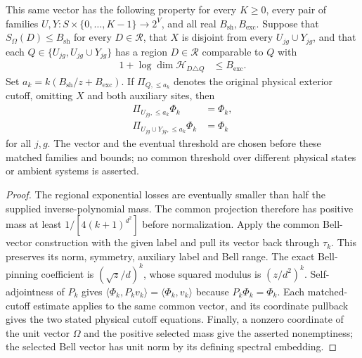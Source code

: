 \begin{theorem}
    This same vector has the following property for every $K\ge0$, every
    pair of families $U,Y:S\times\{0,\ldots,K-1\}\to2^V$, and all real
    $B_{\mathrm{sh}},B_{\mathrm{exc}}$. Suppose that
    $S_\Omega(D)\le B_{\mathrm{sh}}$ for every $D\in\mathcal R$, that
    $X$ is disjoint from every $U_{jg}\cup Y_{jg}$, and that each
    $Q\in\{U_{jg},U_{jg}\cup Y_{jg}\}$ has a region $D\in\mathcal R$
    comparable to $Q$ with
    \begin{align*}
        1+\log\dim\mathcal H_{D\triangle Q}&\le B_{\mathrm{exc}}.
    \end{align*}
    Set $a_k=k(B_{\mathrm{sh}}/z+B_{\mathrm{exc}})$. If
    $\Pi_{Q,\le a_k}$ denotes the original physical exterior cutoff,
    omitting $X$ and both auxiliary sites, then
    \begin{align*}
        \Pi_{U_{jg},\le a_k}\Phi_k&=\Phi_k, \\
        \Pi_{U_{jg}\cup Y_{jg},\le a_k}\Phi_k&=\Phi_k
    \end{align*}
    for all $j,g$. The vector and the eventual threshold are chosen before
    these matched families and bounds; no common threshold over different
    physical states or ambient systems is asserted.
\end{theorem}

\begin{proof}\leanok
    The regional exponential losses are eventually smaller than half the
    supplied inverse-polynomial mass. The common projection therefore has
    positive mass at least $1/[4(k+1)^{d^2}]$ before normalization. Apply the
    common Bell-vector construction with the given label and pull its vector
    back through $\tau_k$. This preserves its norm, symmetry, auxiliary label
    and Bell range. The exact Bell-pinning coefficient is
    $(\sqrt z/d)^k$, whose squared modulus is $(z/d^2)^k$. Self-adjointness
    of $P_k$ gives $\langle\Phi_k,P_kv_k\rangle=\langle\Phi_k,v_k\rangle$
    because $P_k\Phi_k=\Phi_k$.
    Each matched-cutoff estimate applies to the same common vector, and its
    coordinate pullback gives the two stated physical cutoff equations.
    Finally, a nonzero coordinate of the unit vector $\Omega$ and the positive
    selected mass give the asserted nonemptiness; the selected Bell vector
    has unit norm by its defining spectral embedding.
\end{proof}

